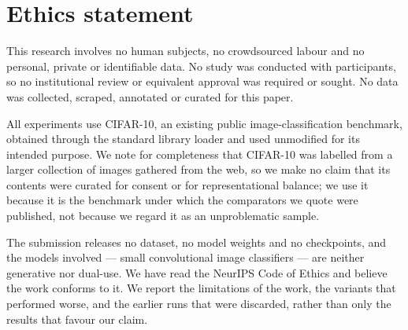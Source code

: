 %

\section{Ethics statement}
\label{sec:stmt:ethics}

This research involves no human subjects, no crowdsourced labour and no
personal, private or identifiable data. No study was conducted with
participants, so no institutional review or equivalent approval was required or
sought. No data was collected, scraped, annotated or curated for this paper.

All experiments use CIFAR-10, an existing public image-classification
benchmark, obtained through the standard library loader and used unmodified for
its intended purpose. We note for completeness that CIFAR-10 was labelled from a
larger collection of images gathered from the web, so we make no claim that its
contents were curated for consent or for representational balance; we use it
because it is the benchmark under which the comparators we quote were published,
not because we regard it as an unproblematic sample.

The submission releases no dataset, no model weights and no checkpoints, and the
models involved --- small convolutional image classifiers --- are neither
generative nor dual-use. We have read the NeurIPS Code of Ethics and believe the
work conforms to it. We report the limitations of the work, the variants that
performed worse, and the earlier runs that were discarded, rather than only the
results that favour our claim.
